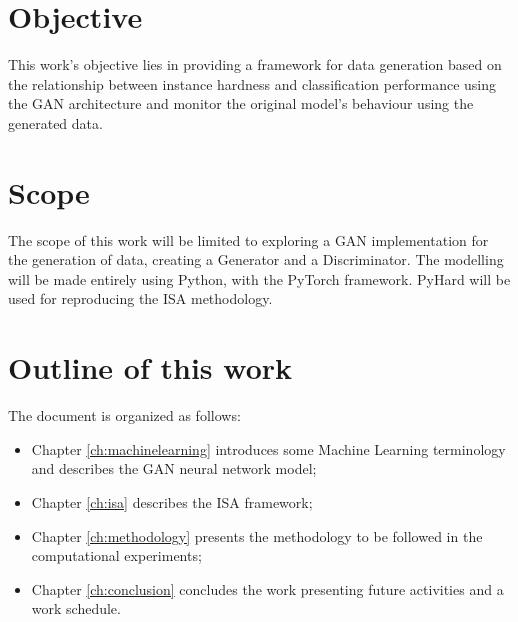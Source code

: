 \section{Objective}

This work's objective lies in providing a framework for data generation based on the relationship between instance hardness and classification performance using the GAN architecture and monitor the original model's behaviour using the generated data. 

\section{Scope}

The scope of this work will be limited to exploring a GAN implementation for the generation of data, creating a Generator and a Discriminator.  The modelling will be made entirely using Python, with the PyTorch \cite{paszke2019pytorch} framework. PyHard \cite{Lorena2022} will be used for reproducing the ISA methodology.




\section{Outline of this work}

The document is organized as follows:

\begin{itemize}
	\item Chapter \ref{ch:machinelearning}  introduces some Machine Learning terminology and describes the GAN neural network model;
	\item Chapter \ref{ch:isa} describes the ISA framework;
	\item Chapter \ref{ch:methodology} presents the methodology to be followed in the computational experiments;
	\item Chapter \ref{ch:conclusion} concludes the work presenting future activities and a work schedule.
\end{itemize}
